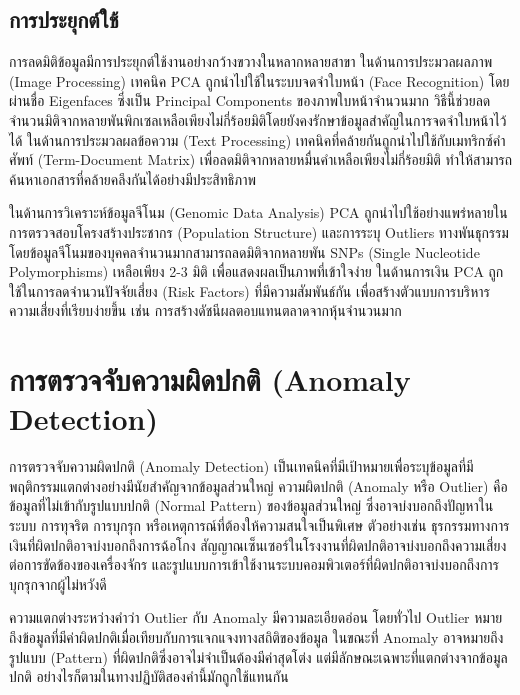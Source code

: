 \subsection{การประยุกต์ใช้}

การลดมิติข้อมูลมีการประยุกต์ใช้งานอย่างกว้างขวางในหลากหลายสาขา ในด้านการประมวลผลภาพ (Image Processing) เทคนิค PCA ถูกนำไปใช้ในระบบจดจำใบหน้า (Face Recognition) โดยผ่านชื่อ Eigenfaces ซึ่งเป็น Principal Components ของภาพใบหน้าจำนวนมาก วิธีนี้ช่วยลดจำนวนมิติจากหลายพันพิกเซลเหลือเพียงไม่กี่ร้อยมิติโดยยังคงรักษาข้อมูลสำคัญในการจดจำใบหน้าไว้ได้ ในด้านการประมวลผลข้อความ (Text Processing) เทคนิคที่คล้ายกันถูกนำไปใช้กับเมทริกซ์คำศัพท์ (Term-Document Matrix) เพื่อลดมิติจากหลายหมื่นคำเหลือเพียงไม่กี่ร้อยมิติ ทำให้สามารถค้นหาเอกสารที่คล้ายคลึงกันได้อย่างมีประสิทธิภาพ

ในด้านการวิเคราะห์ข้อมูลจีโนม (Genomic Data Analysis) PCA ถูกนำไปใช้อย่างแพร่หลายในการตรวจสอบโครงสร้างประชากร (Population Structure) และการระบุ Outliers ทางพันธุกรรม โดยข้อมูลจีโนมของบุคคลจำนวนมากสามารถลดมิติจากหลายพัน SNPs (Single Nucleotide Polymorphisms) เหลือเพียง 2-3 มิติ เพื่อแสดงผลเป็นภาพที่เข้าใจง่าย ในด้านการเงิน PCA ถูกใช้ในการลดจำนวนปัจจัยเสี่ยง (Risk Factors) ที่มีความสัมพันธ์กัน เพื่อสร้างตัวแบบการบริหารความเสี่ยงที่เรียบง่ายขึ้น เช่น การสร้างดัชนีผลตอบแทนตลาดจากหุ้นจำนวนมาก

\section{การตรวจจับความผิดปกติ (Anomaly Detection)}

การตรวจจับความผิดปกติ (Anomaly Detection) เป็นเทคนิคที่มีเป้าหมายเพื่อระบุข้อมูลที่มีพฤติกรรมแตกต่างอย่างมีนัยสำคัญจากข้อมูลส่วนใหญ่ ความผิดปกติ (Anomaly หรือ Outlier) คือข้อมูลที่ไม่เข้ากับรูปแบบปกติ (Normal Pattern) ของข้อมูลส่วนใหญ่ ซึ่งอาจบ่งบอกถึงปัญหาในระบบ การทุจริต การบุกรุก หรือเหตุการณ์ที่ต้องให้ความสนใจเป็นพิเศษ ตัวอย่างเช่น ธุรกรรมทางการเงินที่ผิดปกติอาจบ่งบอกถึงการฉ้อโกง สัญญาณเซ็นเซอร์ในโรงงานที่ผิดปกติอาจบ่งบอกถึงความเสี่ยงต่อการขัดข้องของเครื่องจักร และรูปแบบการเข้าใช้งานระบบคอมพิวเตอร์ที่ผิดปกติอาจบ่งบอกถึงการบุกรุกจากผู้ไม่หวังดี

ความแตกต่างระหว่างคำว่า Outlier กับ Anomaly มีความละเอียดอ่อน โดยทั่วไป Outlier หมายถึงข้อมูลที่มีค่าผิดปกติเมื่อเทียบกับการแจกแจงทางสถิติของข้อมูล ในขณะที่ Anomaly อาจหมายถึงรูปแบบ (Pattern) ที่ผิดปกติซึ่งอาจไม่จำเป็นต้องมีค่าสุดโต่ง แต่มีลักษณะเฉพาะที่แตกต่างจากข้อมูลปกติ อย่างไรก็ตามในทางปฏิบัติสองคำนี้มักถูกใช้แทนกัน

